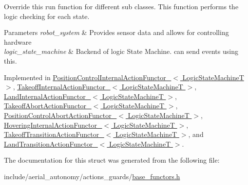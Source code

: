 Override this run function for different sub classes. This function performs the logic checking for each state. 


\begin{DoxyParams}{Parameters}
{\em robot\-\_\-system} & Provides sensor data and allows for controlling hardware \\
\hline
{\em logic\-\_\-state\-\_\-machine} & Backend of logic State Machine. can send events using this. \\
\hline
\end{DoxyParams}


Implemented in \hyperlink{structPositionControlInternalActionFunctor___a81589e5ecfba853969942b9842ac1563}{Position\-Control\-Internal\-Action\-Functor\-\_\-$<$ Logic\-State\-Machine\-T $>$}, \hyperlink{structTakeoffInternalActionFunctor___a2118df6e326662cd0088344499e49696}{Takeoff\-Internal\-Action\-Functor\-\_\-$<$ Logic\-State\-Machine\-T $>$}, \hyperlink{structLandInternalActionFunctor___a4557b02d6cfa6712b610337cb606f54b}{Land\-Internal\-Action\-Functor\-\_\-$<$ Logic\-State\-Machine\-T $>$}, \hyperlink{structTakeoffAbortActionFunctor___a8366919888a54d029b3856c3a433843d}{Takeoff\-Abort\-Action\-Functor\-\_\-$<$ Logic\-State\-Machine\-T $>$}, \hyperlink{structPositionControlAbortActionFunctor___a04152d311e51abb5b330ee74b3c29702}{Position\-Control\-Abort\-Action\-Functor\-\_\-$<$ Logic\-State\-Machine\-T $>$}, \hyperlink{structHoveringInternalActionFunctor___a87bb8dd8ed71e54729967b9e258fb66e}{Hovering\-Internal\-Action\-Functor\-\_\-$<$ Logic\-State\-Machine\-T $>$}, \hyperlink{structTakeoffTransitionActionFunctor___aaf8ba8ac8cf0f07e2978da244b5efb2b}{Takeoff\-Transition\-Action\-Functor\-\_\-$<$ Logic\-State\-Machine\-T $>$}, and \hyperlink{structLandTransitionActionFunctor___ae91b354f041edda283e306fa312e1213}{Land\-Transition\-Action\-Functor\-\_\-$<$ Logic\-State\-Machine\-T $>$}.



The documentation for this struct was generated from the following file\-:\begin{DoxyCompactItemize}
\item 
include/aerial\-\_\-autonomy/actions\-\_\-guards/\hyperlink{base__functors_8h}{base\-\_\-functors.\-h}\end{DoxyCompactItemize}
